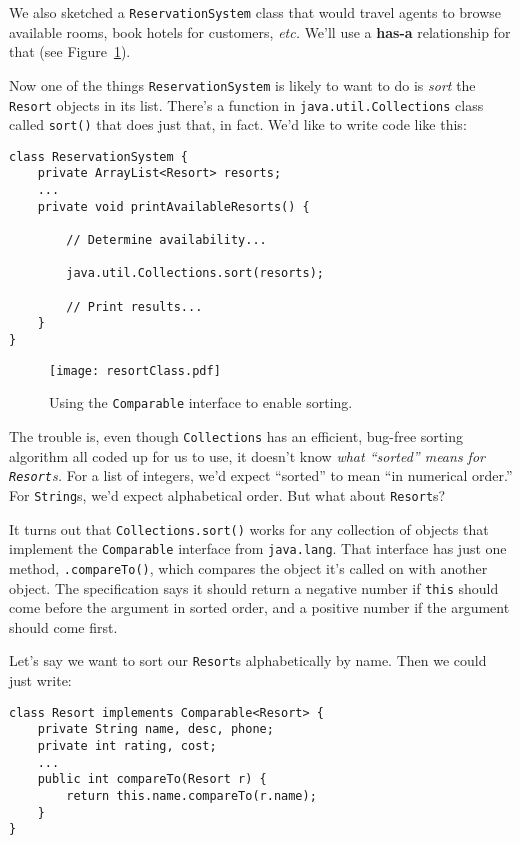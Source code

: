 We also sketched a \texttt{ReservationSystem} class that would travel agents
to browse available rooms, book hotels for customers, \textit{etc.} We'll use
a \textbf{has-a} relationship for that (see Figure~\ref{fig:resortClass}).

Now one of the things \texttt{ReservationSystem} is likely to want to do is
\textit{sort} the \texttt{Resort} objects in its list. There's a function in
\texttt{java.util.Collections} class called \texttt{sort()} that does just
that, in fact. We'd like to write code like this:

\begin{Verbatim}[fontsize=\small,samepage=true,frame=single]
class ReservationSystem {
    private ArrayList<Resort> resorts;
    ...
    private void printAvailableResorts() {

        // Determine availability...

        java.util.Collections.sort(resorts);

        // Print results...
    }
}
\end{Verbatim}

\begin{figure}[hb]
\centering
\texttt{[image: resortClass.pdf]}
\caption{Using the \texttt{Comparable} interface to enable sorting.}
\label{fig:resortClass}
\end{figure}

The trouble is, even though \texttt{Collections} has an efficient, bug-free
sorting algorithm all coded up for us to use, it doesn't know \textit{what
``sorted'' means for \texttt{Resort}s.} For a list of integers, we'd expect
``sorted'' to mean ``in numerical order.'' For \texttt{String}s, we'd expect
alphabetical order. But what about \texttt{Resort}s?

It turns out that \texttt{Collections.sort()} works for any collection of
objects that implement the \texttt{Comparable} interface from
\texttt{java.lang}. That interface has just one method, \texttt{.compareTo()},
which compares the object it's called on with another object. The
specification says it should return a negative number if \texttt{this} should
come before the argument in sorted order, and a positive number if the
argument should come first.

Let's say we want to sort our \texttt{Resort}s alphabetically by name. Then we
could just write:

\begin{Verbatim}[fontsize=\footnotesize,samepage=true,frame=single]
class Resort implements Comparable<Resort> {
    private String name, desc, phone;
    private int rating, cost;
    ...
    public int compareTo(Resort r) {
        return this.name.compareTo(r.name);
    }
}
\end{Verbatim}


